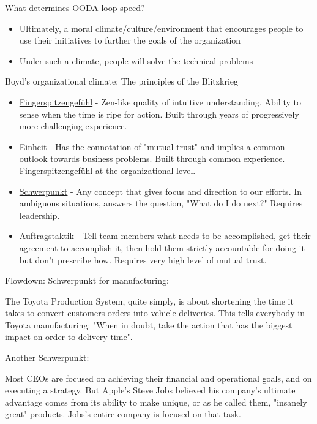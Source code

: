 What determines OODA loop speed?
\begin{itemize}
    \item Ultimately, a moral climate/culture/environment that encourages
        people to use their initiatives to further the goals of the organization
    \item Under such a climate, people will solve the technical problems
\end{itemize}

Boyd's organizational climate: The principles of the Blitzkrieg
\begin{itemize}
    \item \underline{Fingerspitzengefühl} - Zen-like quality of intuitive
        understanding. Ability to sense when the time is ripe for action. Built
        through years of progressively more challenging experience.
    \item \underline{Einheit} - Has the connotation of "mutual trust" and
        implies a common outlook towards business problems. Built through common
        experience. Fingerspitzengefühl at the organizational level.
    \item \underline{Schwerpunkt} - Any concept that gives focus and direction
        to our efforts. In ambiguous situations, answers the question, "What do
        I do next?" Requires leadership.
    \item \underline{Auftragstaktik} - Tell team members what needs to be
        accomplished, get their agreement to accomplish it, then hold them
        strictly accountable for doing it - but don't prescribe how. Requires
        very high level of mutual trust.
\end{itemize}

Flowdown: Schwerpunkt for manufacturing:

The Toyota Production System, quite simply, is about shortening the time
it takes to convert customers orders into vehicle deliveries. This tells
everybody in Toyota manufacturing: "When in doubt, take the action that has
the biggest impact on order-to-delivery time".

\vspace{1\baselineskip}

Another Schwerpunkt:

Most CEOs are focused on achieving their financial and operational goals,
and on executing a strategy. But Apple's Steve Jobs believed his company's
ultimate advantage comes from its ability to make unique, or as he called
them, "insanely great" products. Jobs's entire company is focused on that
task.

